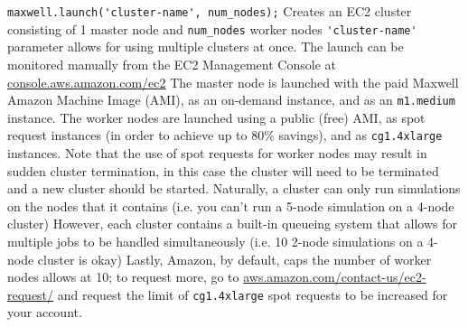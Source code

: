 \documentclass[landscape]{foils}
\begin{document}
\BIT
\I  \verb+maxwell.launch('cluster-name', num_nodes);+
    \BIT
    \I  Creates an EC2 cluster consisting of 1 master node and \verb+num_nodes+ worker nodes
    \I  \verb+'cluster-name'+ parameter allows for using multiple clusters at once.
    \I  The launch can be monitored manually from the EC2 Management Console at \url{console.aws.amazon.com/ec2}
    \EIT
\I  The master node is launched 
    \BIT
    \I  with the paid Maxwell Amazon Machine Image (AMI),
    \I  as an on-demand instance, and 
    \I  as an \texttt{m1.medium} instance.
    \EIT
\I  The worker nodes are launched
    \BIT
    \I  using a public (free) AMI,
    \I  as spot request instances (in order to achieve up to 80\% savings), and
    \I  as \texttt{cg1.4xlarge} instances.
    \EIT
\EIT
Note that the use of spot requests for worker nodes may result in sudden cluster termination, 
in this case the cluster will need to be terminated and a new cluster should be started.
\BIT
\I  Naturally, a cluster can only run simulations on the nodes that it contains
    (i.e. you can't run a 5-node simulation on a 4-node cluster)
\I  However, each cluster contains a built-in queueing system that allows for 
    multiple jobs to be handled simultaneously (i.e. 10 2-node simulations on a 4-node cluster is okay)
\I  Lastly, Amazon, by default, caps the number of worker nodes allows at 10;
    to request more, go to \url{aws.amazon.com/contact-us/ec2-request/}
    and request the limit of \verb+cg1.4xlarge+ spot requests to be increased for your account.
\EIT
\end{document}
